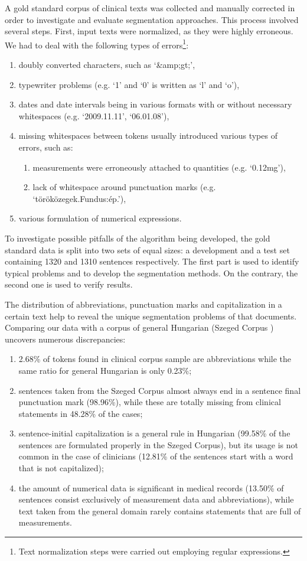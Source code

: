 A gold standard corpus of clinical texts was collected and manually corrected in order to investigate and evaluate segmentation approaches.
This process involved several steps. 
First, input texts were normalized, as they were highly erroneous.
We had to deal with the following types of errors\footnote{Text normalization steps were carried out employing regular expressions.}:
\begin{enumerate}
 \item doubly converted characters, such as `\&amp;gt;',
 \item typewriter problems (e.g. `1' and `0' is written as `l' and `o'),
 \item dates and date intervals being in various formats with or without necessary whitespaces (e.g. `2009.11.11', `06.01.08'),
 \item missing whitespaces between tokens usually introduced various types of errors, such as:
 \begin{enumerate}
  \item measurements were erroneously attached to quantities (e.g. `0.12mg'),
  \item lack of whitespace around punctuation marks (e.g. `töröközegek.Fundus:ép.'),
 \end{enumerate}
 \item various formulation of numerical expressions.
\end{enumerate}
 
To investigate possible pitfalls of the algorithm being developed, the gold standard data is split into two sets of equal sizes: a development and a test set containing 1320 and 1310 sentences respectively. 
The first part is used to identify typical problems and to develop the segmentation methods. 
On the contrary, the second one is used to verify results. 

The distribution of abbreviations, punctuation marks and capitalization in a certain text help to reveal the unique segmentation problems of that documents. 
Comparing our data with a corpus of general Hungarian (Szeged Corpus \cite{Csendes2004}) uncovers numerous discrepancies: 
\begin{enumerate}
 \item 2.68\% of tokens found in clinical corpus sample are abbreviations while the same ratio for general Hungarian is only 0.23\%; 
 \item sentences taken from the Szeged Corpus almost always end in a sentence final punctuation mark (98.96\%), while these are totally missing from clinical statements in 48.28\% of the cases; 
 \item sentence-initial capitalization is a general rule in Hungarian (99.58\% of the sentences are formulated properly in the Szeged Corpus), but its usage is not common in the case of clinicians (12.81\% of the sentences start with a word that is not capitalized); 
 \item the amount of numerical data is significant in medical records (13.50\% of sentences consist exclusively of measurement data and abbreviations), while text taken from the general domain rarely contains statements that are full of measurements. 
\end{enumerate}

